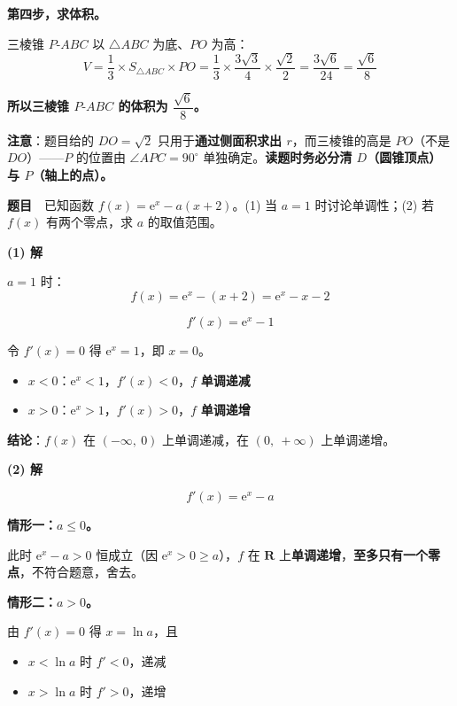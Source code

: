 \textbf{第四步，求体积。}

三棱锥 $P\text{-}ABC$ 以 $\triangle ABC$ 为底、$PO$ 为高：
\[V=\frac13\times S_{\triangle ABC}\times PO=\frac13\times\frac{3\sqrt3}4\times\frac{\sqrt2}2=\frac{3\sqrt6}{24}=\frac{\sqrt6}8\]

\textbf{所以三棱锥 $P\text{-}ABC$ 的体积为 $\dfrac{\sqrt6}8$。}

\begin{gktip}
\textbf{注意}：题目给的 $DO=\sqrt2$ 只用于\textbf{通过侧面积求出 $r$}，而三棱锥的高是 $PO$（不是 $DO$）——$P$ 的位置由 $\angle APC=90^\circ$ 单独确定。\textbf{读题时务必分清 $D$（圆锥顶点）与 $P$（轴上的点）。}
\end{gktip}

\par\medskip


\textbf{题目}　已知函数 $f(x)=\mathrm e^{x}-a(x+2)$。(1) 当 $a=1$ 时讨论单调性；(2) 若 $f(x)$ 有两个零点，求 $a$ 的取值范围。

\par\medskip

\textbf{(1) 解}

$a=1$ 时：
\[f(x)=\mathrm e^{x}-(x+2)=\mathrm e^{x}-x-2\]

\[f'(x)=\mathrm e^{x}-1\]

令 $f'(x)=0$ 得 $\mathrm e^{x}=1$，即 $x=0$。

\begin{itemize}
\item $x<0$：$\mathrm e^{x}<1$，$f'(x)<0$，$f$ \textbf{单调递减}
\item $x>0$：$\mathrm e^{x}>1$，$f'(x)>0$，$f$ \textbf{单调递增}
\end{itemize}

\textbf{结论}：$f(x)$ 在 $(-\infty,\ 0)$ 上单调递减，在 $(0,\ +\infty)$ 上单调递增。

\par\medskip

\textbf{(2) 解}

\[f'(x)=\mathrm e^{x}-a\]

\textbf{情形一：$a\le0$。}

此时 $\mathrm e^{x}-a>0$ 恒成立（因 $\mathrm e^{x}>0\ge a$），$f$ 在 $\mathbf R$ 上\textbf{单调递增}，\textbf{至多只有一个零点}，不符合题意，舍去。

\textbf{情形二：$a>0$。}

由 $f'(x)=0$ 得 $x=\ln a$，且
\begin{itemize}
\item $x<\ln a$ 时 $f'<0$，递减
\item $x>\ln a$ 时 $f'>0$，递增
\end{itemize}

